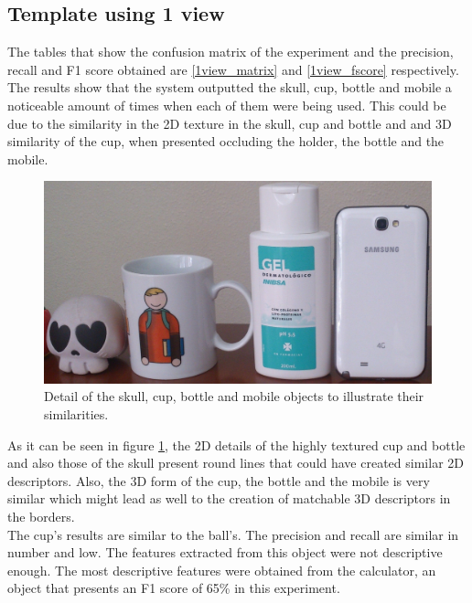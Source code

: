 	\subsection{Template using 1 view}
	The tables that show the confusion matrix of the experiment and the precision, recall and F1 score obtained are \ref{1view_matrix} and \ref{1view_fscore} respectively. 
	The results show that the system outputted the skull, cup, bottle and mobile a noticeable amount of times when each of them were being used. 
	This could be due to the similarity in the 2D texture in the skull, cup and bottle and and 3D similarity of the cup, when presented occluding the holder, the bottle and the mobile. 

	\begin{figure}[h]
		\begin{center}
	    \includegraphics[width=\linewidth]{img/discussion/comparison1.jpg}
		\caption[Comparison: Skull, cup, bottle and mobile]{Detail of the skull, cup, bottle and mobile objects to illustrate their similarities. }
		\label{comparison1}
		\end{center}
	\end{figure}

	As it can be seen in figure \ref{comparison1}, the 2D details of the highly textured cup and bottle and also those of the skull present round lines that could have created similar 2D descriptors. 
	Also, the 3D form of the cup, the bottle and the mobile is very similar which might lead as well to the creation of matchable 3D descriptors in the borders. 
	\\

	The cup's results are similar to the ball's. 
	The precision and recall are similar in number and low. 
	The features extracted from this object were not descriptive enough.
	The most descriptive features were obtained from the calculator, an object that presents an F1 score of 65\% in this experiment. 

